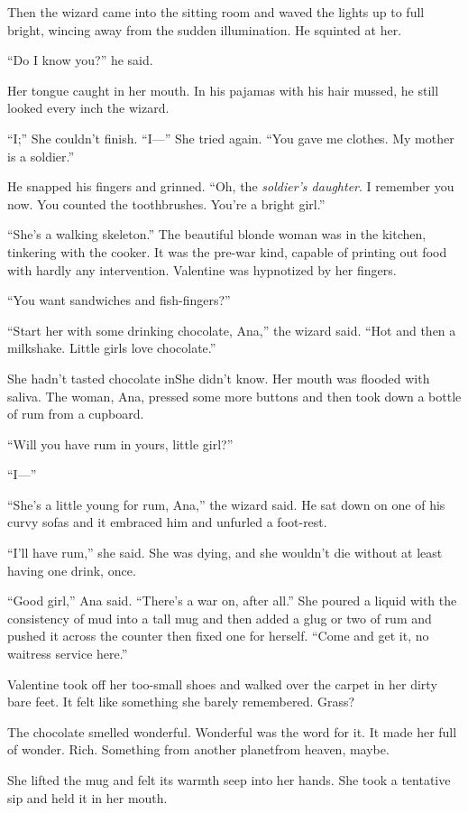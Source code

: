 Then the wizard came into the sitting room and waved the lights up
to full bright, wincing away from the sudden illumination. He
squinted at her.

“Do I know you?” he said.

Her tongue caught in her mouth. In his pajamas with his hair
mussed, he still looked every inch the wizard.

“I;” She couldn’t finish. “I---” She tried again. “You gave me
clothes. My mother is a soldier.”

He snapped his fingers and grinned. “Oh, the
\emph{soldier’s daughter}. I remember you now. You counted the
toothbrushes. You’re a bright girl.”

“She’s a walking skeleton.” The beautiful blonde woman was in the
kitchen, tinkering with the cooker. It was the pre-war kind,
capable of printing out food with hardly any intervention.
Valentine was hypnotized by her fingers.

“You want sandwiches and fish-fingers?”

“Start her with some drinking chocolate, Ana,” the wizard said.
“Hot and then a milkshake. Little girls love chocolate.”

She hadn’t tasted chocolate in\dash{}She didn’t know. Her mouth was
flooded with saliva. The woman, Ana, pressed some more buttons and
then took down a bottle of rum from a cupboard.

“Will you have rum in yours, little girl?”

“I---”

“She’s a little young for rum, Ana,” the wizard said. He sat down
on one of his curvy sofas and it embraced him and unfurled a
foot-rest.

“I’ll have rum,” she said. She was dying, and she wouldn’t die
without at least having one drink, once.

“Good girl,” Ana said. “There’s a war on, after all.” She poured a
liquid with the consistency of mud into a tall mug and then added a
glug or two of rum and pushed it across the counter then fixed one
for herself. “Come and get it, no waitress service here.”

Valentine took off her too-small shoes and walked over the carpet
in her dirty bare feet. It felt like something she barely
remembered. Grass?

The chocolate smelled wonderful. Wonderful was the word for it. It
made her full of wonder. Rich. Something from another planet\dash{}from
heaven, maybe.

She lifted the mug and felt its warmth seep into her hands. She
took a tentative sip and held it in her mouth.

